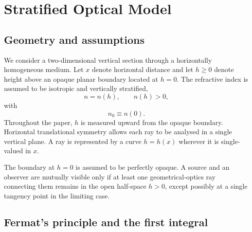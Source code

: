 \section{Stratified Optical Model}
\label{sec:model}

\subsection{Geometry and assumptions}

We consider a two-dimensional vertical section through a horizontally
homogeneous medium. Let $x$ denote horizontal distance and let $h\geq 0$
denote height above an opaque planar boundary located at $h=0$. The
refractive index is assumed to be isotropic and vertically stratified,
\begin{equation}
    n=n(h),
    \qquad n(h)>0,
\end{equation}
with
\begin{equation}
    n_0\equiv n(0).
\end{equation}
Throughout the paper, $h$ is measured upward from the opaque boundary.
Horizontal translational symmetry allows each ray to be analysed in a single
vertical plane. A ray is represented by a curve
$h=h(x)$ wherever it is single-valued in $x$.

The boundary at $h=0$ is assumed to be perfectly opaque. A source and an
observer are mutually visible only if at least one geometrical-optics ray
connecting them remains in the open half-space $h>0$, except possibly at a
single tangency point in the limiting case.

\subsection{Fermat's principle and the first integral}

